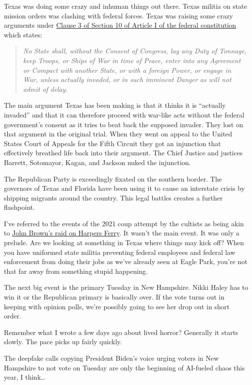 Texas was doing some crazy and inhuman things out there. Texas militia
on state mission orders was clashing with federal forces. Texas was
raising some crazy arguments under
\href{https://constitution.congress.gov/browse/article-1/section-10/clause-3/}{Clause
3 of Section 10 of Article I of the federal constitution} which states:

\begin{quote}
\emph{No State shall, without the Consent of Congress, lay any Duty of
Tonnage, keep Troops, or Ships of War in time of Peace, enter into any
Agreement or Compact with another State, or with a foreign Power, or
engage in War, unless actually invaded, or in such imminent Danger as
will not admit of delay.}
\end{quote}

The main argument Texas has been making is that it thinks it is
``actually invaded'' and that it can therefore proceed with war-like
acts without the federal government's consent as it tries to beat back
the supposed invader. They lost on that argument in the original trial.
When they went on appeal to the United States Court of Appeals for the
Fifth Circuit they got an injunction that effectively breathed life back
into their argument. The Chief Justice and justices Barrett, Sotomayor,
Kagan, and Jackson nuked the injunction.

The Republican Party is exceedingly fixated on the southern border. The
governors of Texas and Florida have been using it to cause an interstate
crisis by shipping migrants around the country. This legal battles
creates a further flashpoint.

I've referred to the events of the 2021 coup attempt by the cultists as
being akin to
\href{https://www.nps.gov/articles/john-browns-raid.htm}{John Brown's
raid on Harpers Ferry}. It wasn't the main event. It was only a prelude.
Are we looking at something in Texas where things may kick off? When you
have uniformed state militia preventing federal employees and federal
law enforcement from doing their jobs as we've already seen at Eagle
Park, you're not that far away from something stupid happening.

The next big event is the primary Tuesday in New Hampshire. Nikki Haley
has to win it or the Republican primary is basically over. If the vote
turns out in keeping with opinion polls, we're possibly going to see her
drop out in short order.

Remember what I wrote a few days ago about lived horror? Generally it
starts slowly. The pace picks up fairly quickly.

The deepfake calls copying President Biden's voice urging voters in New
Hampshire to not vote on Tuesday are only the beginning of AI-fueled
chaos this year, I think\ldots{}
